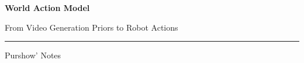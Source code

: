 \documentclass[11pt,a4paper,fontset=none]{ctexart}
\begin{document}
\begin{titlepage}
  \centering
  \vspace*{0.20\textheight}
  {\Huge\bfseries\sffamily\color{wamblue} World Action Model\par}
  \vspace{1.2em}
  {\LARGE\sffamily From Video Generation Priors to Robot Actions\par}
  \vspace{2.2em}
  {\color{wamgray}\rule{0.54\textwidth}{0.6pt}\par}
  \vfill
  {\large\sffamily Purshow' Notes\par}
  \vspace*{0.10\textheight}
\end{titlepage}

\tableofcontents
\clearpage

\end{document}
